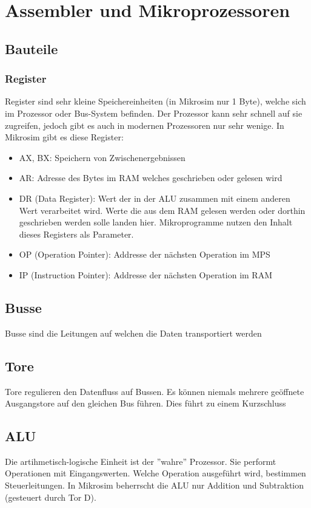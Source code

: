\documentclass{article}
\begin{document}
\section*{Assembler und Mikroprozessoren}
\subsection*{Bauteile}
\subsubsection*{Register}
Register sind sehr kleine Speichereinheiten (in Mikrosim nur 1 Byte), welche sich im Prozessor oder Bus-System
befinden. Der Prozessor kann sehr schnell auf sie zugreifen, jedoch gibt es auch in modernen Prozessoren nur
sehr wenige. In Mikrosim gibt es diese Register:
\begin{itemize}
    \item AX, BX: Speichern von Zwischenergebnissen
    \item AR: Adresse des Bytes im RAM welches geschrieben oder gelesen wird
    \item DR (Data Register): Wert der in der ALU zusammen mit einem anderen Wert verarbeitet wird. Werte die aus dem RAM gelesen werden oder dorthin
    geschrieben werden solle landen hier. Mikroprogramme nutzen den Inhalt dieses Registers als Parameter.
    \item OP (Operation Pointer): Addresse der nächsten Operation im MPS
    \item IP (Instruction Pointer): Addresse der nächsten Operation im RAM
\end{itemize} 
\subsection*{Busse}
Busse sind die Leitungen auf welchen die Daten transportiert werden
\subsection*{Tore}
Tore regulieren den Datenfluss auf Bussen. Es können niemals mehrere geöffnete Ausgangstore auf den gleichen Bus führen.
Dies führt zu einem Kurzschluss
\subsection*{ALU}
Die artihmetisch-logische Einheit ist der ''wahre'' Prozessor. Sie performt Operationen mit Eingangswerten. Welche
Operation ausgeführt wird, bestimmen Steuerleitungen. In Mikrosim beherrscht die ALU nur Addition und Subtraktion
(gesteuert durch Tor D).
\end{document}
